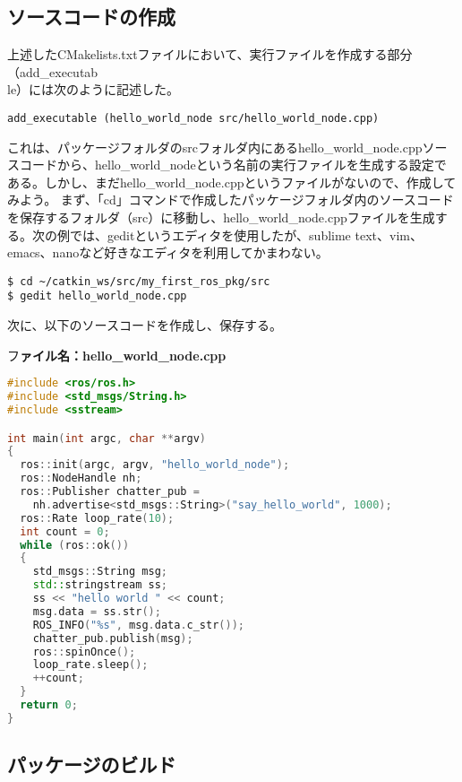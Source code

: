 \subsection{ソースコードの作成}
上述したCMakelists.txtファイルにおいて、実行ファイルを作成する部分（add\_executab\\le）には次のように記述した。

\begin{lstlisting}[language=ROS]
add_executable (hello_world_node src/hello_world_node.cpp)
\end{lstlisting}

これは、パッケージフォルダのsrcフォルダ内にあるhello\_world\_node.cppソースコードから、hello\_world\_nodeという名前の実行ファイルを生成する設定である。しかし、まだhello\_world\_node.cppというファイルがないので、作成してみよう。
まず、「cd」コマンドで作成したパッケージフォルダ内のソースコードを保存するフォルダ（src）に移動し、hello\_world\_node.cppファイルを生成する。次の例では、geditというエディタを使用したが、sublime text、vim、emacs、nanoなど好きなエディタを利用してかまわない。

\begin{lstlisting}[language=ROS]
$ cd ~/catkin_ws/src/my_first_ros_pkg/src
$ gedit hello_world_node.cpp
\end{lstlisting}

次に、以下のソースコードを作成し、保存する。

フ\noindent\textbf{ァイル名：hello\_world\_node.cpp}

\begin{lstlisting}[language=C++]
#include <ros/ros.h>
#include <std_msgs/String.h>
#include <sstream>

int main(int argc, char **argv)
{
  ros::init(argc, argv, "hello_world_node");
  ros::NodeHandle nh;
  ros::Publisher chatter_pub =
    nh.advertise<std_msgs::String>("say_hello_world", 1000);
  ros::Rate loop_rate(10);
  int count = 0;
  while (ros::ok())
  {
    std_msgs::String msg;
    std::stringstream ss;
    ss << "hello world " << count;
    msg.data = ss.str();
    ROS_INFO("%s", msg.data.c_str());
    chatter_pub.publish(msg);
    ros::spinOnce();
    loop_rate.sleep();
    ++count;
  }
  return 0;
}
\end{lstlisting}

\subsection{パッケージのビルド}

